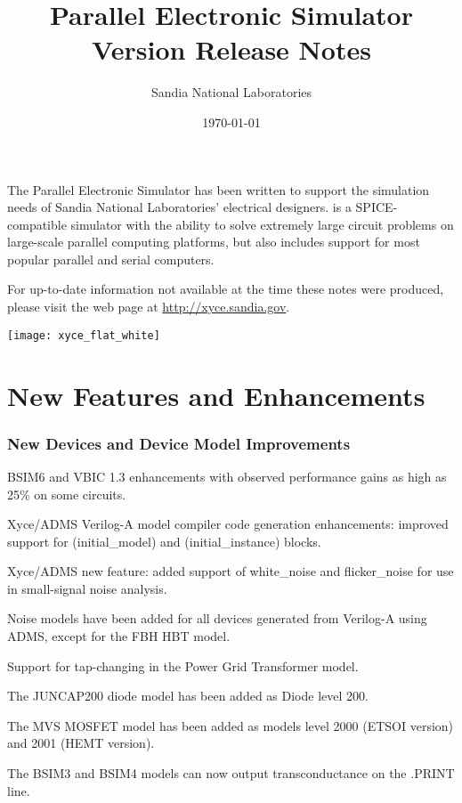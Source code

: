 \documentclass{article}
\title{\XyceTitle{} Parallel Electronic Simulator\\
Version \XyceVersionVar{} Release Notes}
\author{ Sandia National Laboratories}
\date{\today}
\begin{document}
\maketitle

The \XyceTM{} Parallel Electronic Simulator has been written to support the
simulation needs of Sandia National Laboratories' electrical designers.
\XyceTM{} is a SPICE-compatible simulator with the ability to solve extremely
large circuit problems on large-scale parallel computing platforms, but also
includes support for most popular parallel and serial computers.

For up-to-date information not available at the time these notes were produced,
please visit the \XyceTM{} web page at
{\color{XyceDeepRed}\url{http://xyce.sandia.gov}}.

\tableofcontents
\vspace*{\fill}
\parbox{\textwidth}
{
  \hfill
  \texttt{[image: xyce\_flat\_white]}
}


\newpage
\section{New Features and Enhancements}

\subsubsection*{New Devices and Device Model Improvements}
\begin{XyceItemize}
  \item BSIM6 and VBIC 1.3 enhancements with observed performance gains as high as 25\% on some circuits.
  \item Xyce/ADMS Verilog-A model compiler code generation enhancements: improved support for \@(initial\_model) and \@(initial\_instance) blocks.
  \item Xyce/ADMS new feature: added support of white\_noise and flicker\_noise for use in small-signal noise analysis.
  \item Noise models have been added for all devices generated from Verilog-A using ADMS, except for the FBH HBT model.
  \item Support for tap-changing in the Power Grid Transformer model.
  \item The JUNCAP200 diode model has been added as Diode level 200.
  \item The MVS MOSFET model has been added as models level 2000 (ETSOI version) and 2001 (HEMT version).
  \item The BSIM3 and BSIM4 models can now output transconductance on the .PRINT line.
\end{XyceItemize}
\end{document}
